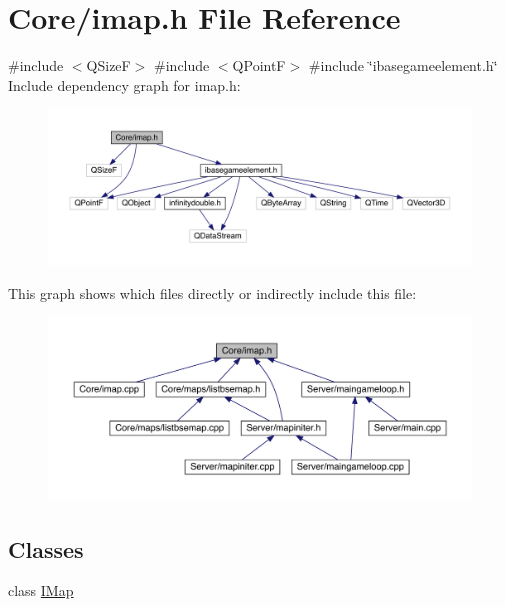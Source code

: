 \hypertarget{a00053}{}\section{Core/imap.h File Reference}
\label{a00053}
{\ttfamily \#include $<$Q\+SizeF$>$}\newline
{\ttfamily \#include $<$Q\+PointF$>$}\newline
{\ttfamily \#include \char`\"{}ibasegameelement.\+h\char`\"{}}\newline
Include dependency graph for imap.\+h\+:
\nopagebreak
\begin{figure}[H]
\begin{center}
\leavevmode
\includegraphics[width=350pt]{d1/dea/a00054}
\end{center}
\end{figure}
This graph shows which files directly or indirectly include this file\+:
\nopagebreak
\begin{figure}[H]
\begin{center}
\leavevmode
\includegraphics[width=350pt]{d4/d6d/a00055}
\end{center}
\end{figure}
\subsection*{Classes}
\begin{DoxyCompactItemize}
\item 
class \hyperlink{a00165}{I\+Map}
\end{DoxyCompactItemize}

